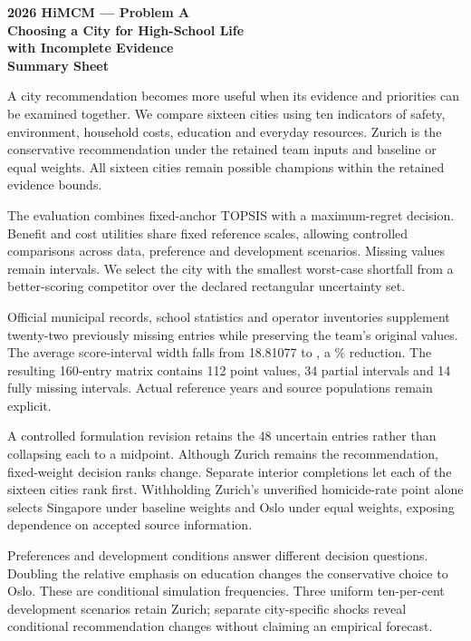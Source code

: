 \thispagestyle{fancy}
\begin{center}
\textbf{2026 HiMCM --- Problem A}\\[9pt]
{\Large\bfseries Choosing a City for High-School Life\\with Incomplete Evidence}\\[12pt]
\textbf{Summary Sheet}
\end{center}
A city recommendation becomes more useful when its evidence and priorities can
be examined together. We compare sixteen cities using ten indicators of safety,
environment, household costs, education and everyday resources. Zurich is the
conservative recommendation under the retained team inputs and baseline or equal weights. All sixteen
cities remain possible champions within the retained evidence bounds.

The evaluation combines fixed-anchor TOPSIS with a maximum-regret decision.
Benefit and cost utilities share fixed reference scales, allowing controlled
comparisons across data, preference and development scenarios. Missing values
remain intervals. We select the city with the smallest worst-case shortfall from
a better-scoring competitor over the declared rectangular uncertainty set.

Official municipal records, school statistics and operator inventories supplement
twenty-two previously missing entries while preserving the team's original values.
The average score-interval width falls from 18.81077 to \CurrentMeanWidth{}, a \TotalWidthReduction\%
reduction. The resulting 160-entry matrix contains 112 point values, 34 partial
intervals and 14 fully missing intervals. Actual reference years and source
populations remain explicit.

A controlled formulation revision retains the 48 uncertain entries rather
than collapsing each to a midpoint. Although Zurich remains the recommendation, \RevisionRankChanges{}
fixed-weight decision ranks change. Separate interior completions let each of the sixteen cities rank first.
Withholding Zurich's unverified homicide-rate point alone selects Singapore
under baseline weights and Oslo under equal weights, exposing dependence on
accepted source information.

Preferences and development conditions answer different decision questions.
Doubling the relative emphasis on education changes the conservative choice to
Oslo. \SummaryWeightMC{} These are conditional simulation frequencies.
Three uniform ten-per-cent development scenarios retain Zurich; separate
city-specific shocks reveal conditional recommendation changes without claiming
an empirical forecast.

